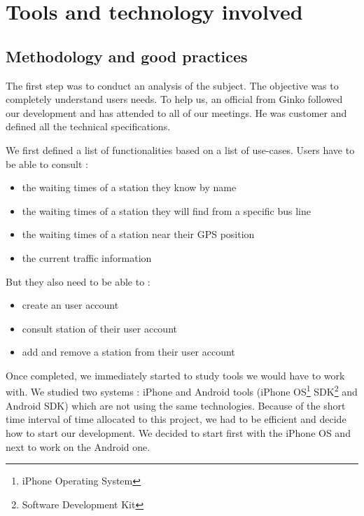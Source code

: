 \documentclass[a4paper, 12pt]{report}
\begin{document}


\chapter{Tools and technology involved}

\section{Methodology and good practices}


The first step was to conduct an analysis of the subject. The objective was to completely understand users needs. To help us, an official from Ginko followed our development and has attended to all of our meetings. He was customer and defined all the technical specifications.

We first defined a list of functionalities based on a list of use-cases. Users have to be able to consult :

\begin{itemize}
	\item the waiting times of a station they know by name
	\item the waiting times of a station they will find from a specific bus line
	\item the waiting times of a station near their GPS position
	\item the current traffic information
\end{itemize}

But they also need to be able to :

\begin{itemize}
	\item create an user account
	\item consult station of their user account
	\item add and remove a station from their user account
\end{itemize}

Once completed, we immediately started to study tools we would have to work with. We studied two systems : iPhone and Android tools (iPhone OS\footnote{iPhone Operating System} SDK\footnote{Software Development Kit} and Android SDK) which are not using the same technologies. Because of the short time interval of time allocated to this project, we had to be efficient and decide how to start our development. We decided to start first with the iPhone OS and next to work on the Android one. 
\end{document}
